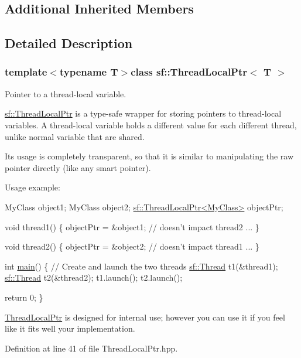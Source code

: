 \subsection*{Additional Inherited Members}


\subsection{Detailed Description}
\subsubsection*{template$<$typename T$>$class sf\-::\-Thread\-Local\-Ptr$<$ T $>$}

Pointer to a thread-\/local variable. 

\hyperlink{classsf_1_1_thread_local_ptr}{sf\-::\-Thread\-Local\-Ptr} is a type-\/safe wrapper for storing pointers to thread-\/local variables. A thread-\/local variable holds a different value for each different thread, unlike normal variable that are shared.

Its usage is completely transparent, so that it is similar to manipulating the raw pointer directly (like any smart pointer).

Usage example\-: 
\begin{DoxyCode}
MyClass object1;
MyClass object2;
\hyperlink{classsf_1_1_thread_local_ptr}{sf::ThreadLocalPtr<MyClass>} objectPtr;

\textcolor{keywordtype}{void} thread1()
\{
    objectPtr = &object1; \textcolor{comment}{// doesn't impact thread2}
    ...
\}

\textcolor{keywordtype}{void} thread2()
\{
    objectPtr = &object2; \textcolor{comment}{// doesn't impact thread1}
    ...
\}

\textcolor{keywordtype}{int} \hyperlink{main_8cpp_ae66f6b31b5ad750f1fe042a706a4e3d4}{main}()
\{
    \textcolor{comment}{// Create and launch the two threads}
    \hyperlink{classsf_1_1_thread}{sf::Thread} t1(&thread1);
    \hyperlink{classsf_1_1_thread}{sf::Thread} t2(&thread2);
    t1.launch();
    t2.launch();

    \textcolor{keywordflow}{return} 0;
\}
\end{DoxyCode}


\hyperlink{classsf_1_1_thread_local_ptr}{Thread\-Local\-Ptr} is designed for internal use; however you can use it if you feel like it fits well your implementation. 

Definition at line 41 of file Thread\-Local\-Ptr.\-hpp.



